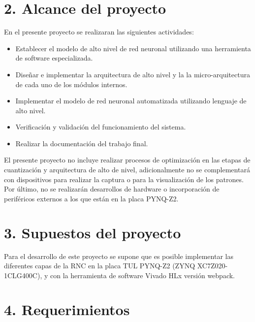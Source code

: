 \documentclass[11pt]{charter}
\begin{document}
\section*{2. Alcance del proyecto}
\label{sec:alcance}

En el presente proyecto se realizaran las siguientes actividades:

\begin{itemize}
	\item Establecer el modelo de alto nivel de red neuronal utilizando una herramienta de software especializada.    
	\item Diseñar e implementar la arquitectura de alto nivel y la la micro-arquitectura de cada uno de los módulos internos.
	\item Implementar el modelo de red neuronal automatizada  utilizando lenguaje de alto nivel.
	\item Verificación y validación del funcionamiento del sistema.
	\item Realizar la documentación del trabajo final. 
\end{itemize}

El presente proyecto no incluye realizar procesos de optimización en las etapas de cuantización y arquitectura de alto de nivel, adicionalmente no se complementará con dispositivos para realizar la captura o para la visualización de los patrones. Por último, no se realizarán desarrollos de hardware o incorporación de periféricos externos a los que están en la placa   PYNQ-Z2.


\section*{3. Supuestos del proyecto}
\label{sec:supuestos}

Para el desarrollo de este proyecto se supone que es posible implementar las diferentes capas de la RNC en la placa TUL PYNQ-Z2 (ZYNQ XC7Z020-1CLG400C), y con la herramienta de software Vivado HLx versión webpack.

\section*{4. Requerimientos}
\label{sec:requerimientos}
\end{document}
